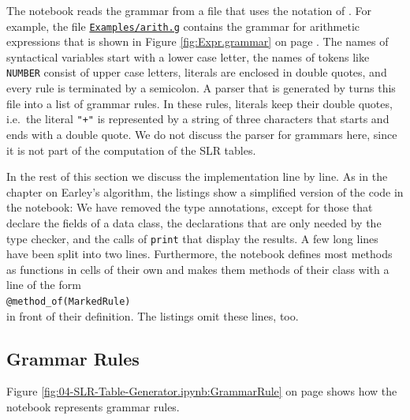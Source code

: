 The notebook reads the grammar from a file that uses the notation of .  For example, the file
\href{https://github.com/karlstroetmann/Formal-Languages/blob/master/Python/Chapter-10/Examples/arith.g}{\texttt{Examples/arith.g}}
contains the grammar for arithmetic expressions that is shown in Figure \ref{fig:Expr.grammar} on page
\pageref{fig:Expr.grammar}.  The names of syntactical variables start with a lower case letter, the names of
tokens like \texttt{NUMBER} consist of upper case letters, literals are enclosed in double quotes, and every
rule is terminated by a semicolon.  A parser that is generated by  turns this file into a list
of grammar rules.  In these rules, literals
keep their double quotes, i.e.~the literal \texttt{"+"} is represented by a string of three characters that
starts and ends with a double quote.  We do not discuss the parser for grammars here, since it is not part of the
computation of the SLR tables.

In the rest of this section we discuss the implementation line by line.  As in the chapter on Earley's algorithm,
the listings show a simplified version of the code in the notebook:  We have removed the type annotations, except
for those that declare the fields of a data class, the declarations that are only needed by the type checker, and
the calls of \texttt{print} that display the results.  A few long lines have been split into two lines.
Furthermore, the notebook defines most methods as functions in cells of their own and makes them methods of their
class with a line of the form
\\[0.2cm]
\hspace*{1.3cm}
\texttt{@method\_of(MarkedRule)}
\\[0.2cm]
in front of their definition.  The listings omit these lines, too.

\subsection{Grammar Rules}
Figure \ref{fig:04-SLR-Table-Generator.ipynb:GrammarRule} on page \pageref{fig:04-SLR-Table-Generator.ipynb:GrammarRule}
shows how the notebook represents grammar rules.

